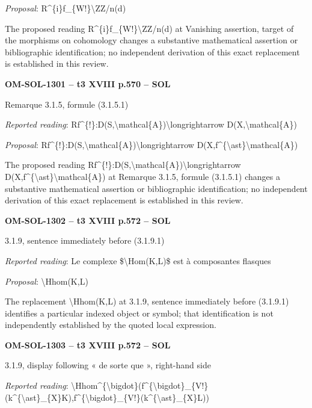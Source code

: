 \emph{Proposal}: R\textasciicircum{}\{i\}f\_\{W!\}\textbackslash{}ZZ/n(d)\par
The proposed reading R\textasciicircum{}\{i\}f\_\{W!\}\textbackslash{}ZZ/n(d) at Vanishing assertion, target of the morphisms on cohomology changes a substantive mathematical assertion or bibliographic identification; no independent derivation of this exact replacement is established in this review.\par
\par\noindent\textbf{OM-SOL-1301 -- t3 XVIII p.570 -- SOL}\par
Remarque 3.1.5, formule (3.1.5.1)\par
\emph{Reported reading}: Rf\textasciicircum{}\{!\}:D(S,\textbackslash{}mathcal\{A\})\textbackslash{}longrightarrow D(X,\textbackslash{}mathcal\{A\})\par
\emph{Proposal}: Rf\textasciicircum{}\{!\}:D(S,\textbackslash{}mathcal\{A\})\textbackslash{}longrightarrow D(X,f\textasciicircum{}\{\textbackslash{}ast\}\textbackslash{}mathcal\{A\})\par
The proposed reading Rf\textasciicircum{}\{!\}:D(S,\textbackslash{}mathcal\{A\})\textbackslash{}longrightarrow D(X,f\textasciicircum{}\{\textbackslash{}ast\}\textbackslash{}mathcal\{A\}) at Remarque 3.1.5, formule (3.1.5.1) changes a substantive mathematical assertion or bibliographic identification; no independent derivation of this exact replacement is established in this review.\par
\par\noindent\textbf{OM-SOL-1302 -- t3 XVIII p.572 -- SOL}\par
3.1.9, sentence immediately before (3.1.9.1)\par
\emph{Reported reading}: Le complexe \$\textbackslash{}Hom(K,L)\$ est à composantes flasques\par
\emph{Proposal}: \textbackslash{}Hhom(K,L)\par
The replacement \textbackslash{}Hhom(K,L) at 3.1.9, sentence immediately before (3.1.9.1) identifies a particular indexed object or symbol; that identification is not independently established by the quoted local expression.\par
\par\noindent\textbf{OM-SOL-1303 -- t3 XVIII p.572 -- SOL}\par
3.1.9, display following « de sorte que », right-hand side\par
\emph{Reported reading}: \textbackslash{}Hhom\textasciicircum{}\{\textbackslash{}bigdot\}(f\textasciicircum{}\{\textbackslash{}bigdot\}\_\{V!\}(k\textasciicircum{}\{\textbackslash{}ast\}\_\{X\}K),f\textasciicircum{}\{\textbackslash{}bigdot\}\_\{V!\}(k\textasciicircum{}\{\textbackslash{}ast\}\_\{X\}L))\par
